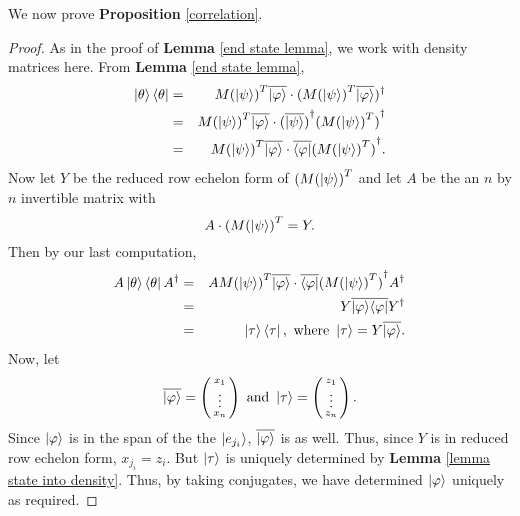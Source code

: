 We now prove {\bf{Proposition}} \ref{correlation}.
\begin{proof}
As in the proof of {\bf{Lemma}} \ref{end state lemma}, we work with density matrices here.  From {\bf{Lemma}} \ref{end state lemma},
\begin{eqnarray}
\ket{\theta}\bra{\theta}&=&{M(\ket{\psi})}^T\overline{\ket{\varphi}}\cdot({M(\ket{\psi})}^T\overline{\ket{\varphi}})^\dagger\\
&=&{M(\ket{\psi})}^T\overline{\ket{\varphi}}\cdot {(\overline{\ket{\psi}})}^\dagger {({M(\ket{\psi})}^T)}^\dagger \\
&=&{M(\ket{\psi})}^T\overline{\ket{\varphi}}\cdot \overline{\bra{\varphi}} {({M(\ket{\psi})}^T)}^\dagger.
\end{eqnarray}
Now let $Y$ be the reduced row echelon form of $({M(\ket{\psi})}^T$ and let $A$ be the an $n$ by $n$ invertible matrix with
\begin{equation}
A \cdot ({M(\ket{\psi})}^T=Y.
\end{equation}
Then by our last computation,
\begin{eqnarray}
A\ket{\theta}\bra{\theta}A^\dagger&=&A {M(\ket{\psi})}^T\overline{\ket{\varphi}}\cdot \overline{\bra{\varphi}} {({M(\ket{\psi})}^T)}^\dagger A^\dagger\\
&=&Y \overline{\ket{\varphi}} \overline{\bra{\varphi}} Y^\dagger\\
&=& \ket{\tau}\bra{\tau},\textrm{ where }\ket{\tau}=Y\overline{\ket{\varphi}}.
\end{eqnarray}
Now, let 
\begin{equation}
\overline{\ket{\varphi}}=\left(\begin{smallmatrix}x_1 \\ \vdots \\ x_n\end{smallmatrix}\right) \textrm{ and }\ket{\tau}=\left(\begin{smallmatrix}z_1\\ \vdots \\ z_n\end{smallmatrix}\right).
\end{equation}
Since $\ket{\varphi}$ is in the span of the the $\ket{e_{j_i}}$, $\overline{\ket{\varphi}}$ is as well.  Thus, since $Y$ is in reduced row echelon form, $x_{j_i}=z_i$.  But $\ket{\tau}$ is uniquely determined by {\bf{Lemma}} \ref{lemma state into density}.  Thus, by taking conjugates, we have determined $\ket{\varphi}$ uniquely as required.


\end{proof} 



